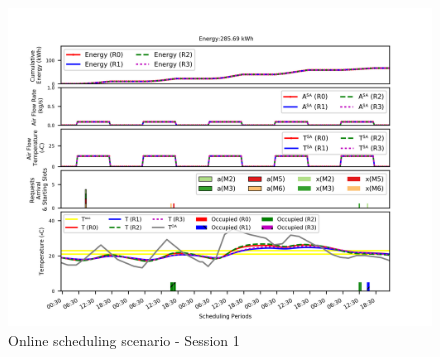 %
%
%
%
%


\begin{figure}[t]
\centering
\includegraphics[width=1\linewidth]{figs/online_r0.png}	
\vspace*{-2ex}
\caption{Online scheduling scenario - Session 1}
\label{fig:online_eg1}
\end{figure}

